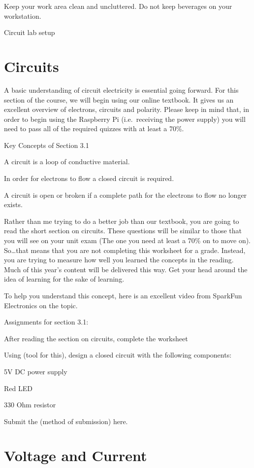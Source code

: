 \documentclass[
]{book}
\begin{document}
Keep your work area clean and uncluttered. Do not keep beverages on your workstation.

Circuit lab setup

\hypertarget{circuits}{%
\section{Circuits}\label{circuits}}

A basic understanding of circuit electricity is essential going forward. For this section of the course, we will begin using our online textbook. It gives us an excellent overview of electrons, circuits and polarity. Please keep in mind that, in order to begin using the Raspberry Pi (i.e.~receiving the power supply) you will need to pass all of the required quizzes with at least a 70\%.

Key Concepts of Section 3.1

A circuit is a loop of conductive material.

In order for electrons to flow a closed circuit is required.

A circuit is open or broken if a complete path for the electrons to flow no longer exists.

Rather than me trying to do a better job than our textbook, you are going to read the short section on circuits. These questions will be similar to those that you will see on your unit exam (The one you need at least a 70\% on to move on). So\ldots that means that you are not completing this worksheet for a grade. Instead, you are trying to measure how well you learned the concepts in the reading. Much of this year's content will be delivered this way. Get your head around the idea of learning for the sake of learning.

To help you understand this concept, here is an excellent video from SparkFun Electronics on the topic.

Assignments for section 3.1:

After reading the section on circuits, complete the worksheet

Using (tool for this), design a closed circuit with the following components:

5V DC power supply

Red LED

330 Ohm resistor

Submit the (method of submission) here.

\hypertarget{voltage-and-current}{%
\section{Voltage and Current}\label{voltage-and-current}}
\end{document}
